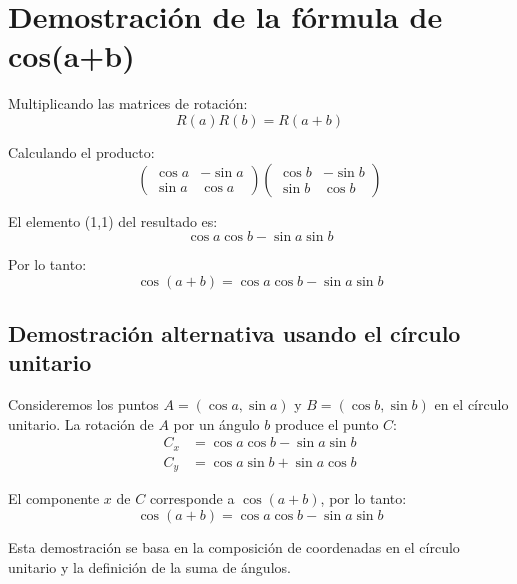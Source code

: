 \section{Demostración de la fórmula de cos(a+b)}\label{sec:demcos}
Multiplicando las matrices de rotación:
\begin{equation*}
R(a) R(b) = R(a + b)
\end{equation*}

Calculando el producto:
\begin{equation*}
\begin{pmatrix}
\cos a & -\sin a \\
\sin a & \cos a
\end{pmatrix}
\begin{pmatrix}
\cos b & -\sin b \\
\sin b & \cos b
\end{pmatrix}
\end{equation*}

El elemento (1,1) del resultado es:
\begin{equation*}
\cos a \cos b - \sin a \sin b
\end{equation*}

Por lo tanto:
\begin{equation*}
\cos(a + b) = \cos a \cos b - \sin a \sin b
\end{equation*}

\subsection*{Demostración alternativa usando el círculo unitario}
Consideremos los puntos $A = (\cos a, \sin a)$ y $B = (\cos b, \sin b)$ en el círculo unitario. La rotación de $A$ por un ángulo $b$ produce el punto $C$:
\begin{align*}
C_x &= \cos a \cos b - \sin a \sin b \\
C_y &= \cos a \sin b + \sin a \cos b
\end{align*}

El componente $x$ de $C$ corresponde a $\cos(a+b)$, por lo tanto:
\begin{equation*}
\cos(a+b) = \cos a \cos b - \sin a \sin b
\end{equation*}

Esta demostración se basa en la composición de coordenadas en el círculo unitario y la definición de la suma de ángulos.

